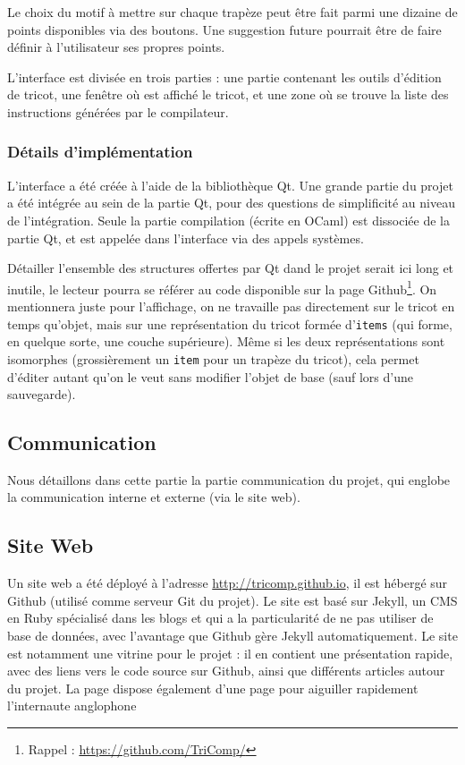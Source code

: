 \documentclass{article}
\begin{document}
Le choix du motif à mettre sur chaque trapèze peut être fait parmi une
dizaine de points disponibles via des boutons. Une suggestion future
pourrait être de faire définir à l'utilisateur ses propres points.

L'interface est divisée en trois parties : une partie contenant les
outils d'édition de tricot, une fenêtre où est affiché le tricot, et
une zone où se trouve la liste des instructions générées par le
compilateur.




\subsubsection{Détails d'implémentation}

L'interface a été créée à l'aide de la bibliothèque Qt. Une grande
partie du projet a été intégrée au sein de la partie Qt, pour des
questions de simplificité au niveau de l'intégration. Seule la partie
compilation (écrite en OCaml) est dissociée de la partie Qt, et est
appelée dans l'interface via des appels systèmes.

Détailler l'ensemble des structures offertes par Qt dand le projet
serait ici long et inutile, le lecteur pourra se référer au code
disponible sur la page Github\footnote{Rappel :
  \url{https://github.com/TriComp/}}. On mentionnera juste pour
l'affichage, on ne travaille pas directement sur le tricot en temps
qu'objet, mais sur une représentation du tricot formée
d'\texttt{items} (qui forme, en quelque sorte, une couche
supérieure). Même si les deux représentations sont isomorphes
(grossièrement un \texttt{item} pour un trapèze du tricot), cela
permet d'éditer autant qu'on le veut sans modifier l'objet de base
(sauf lors d'une sauvegarde).

\subsection{Communication}

Nous détaillons dans cette partie la partie communication du projet,
qui englobe la communication interne et externe (via le site web).

\subsection{Site Web}

Un site web a été déployé à l'adresse \url{http://tricomp.github.io}, il est hébergé
sur Github (utilisé comme serveur Git du projet). Le site est basé sur Jekyll, un 
CMS en Ruby spécialisé dans les blogs et qui a la particularité de ne pas utiliser 
de base de données, avec l'avantage que Github gère Jekyll automatiquement. Le site 
est notamment une vitrine pour le projet : il en contient une présentation rapide, 
avec des liens vers le code source sur Github, ainsi que différents articles autour du projet.
La page dispose également d'une page pour aiguiller rapidement l'internaute anglophone
\end{document}
